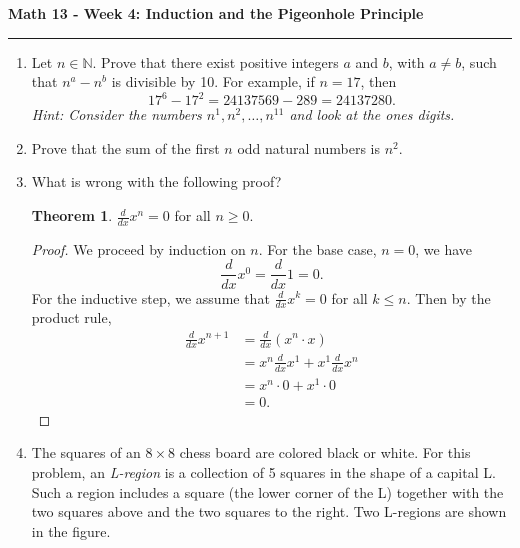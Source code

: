 \documentclass[12pt]{report}
\theoremstyle{definition}
\newtheorem{thm}{Theorem}
\newcommand{\naturals}{\mathbb{N}}
\begin{document}
\begin{center}
{\bf \Large Math 13 - Week 4: Induction and the Pigeonhole Principle}
\vspace{0.2cm}
\hrule
\end{center}

\begin{enumerate}	

\item Let $n\in \naturals$. Prove that there exist positive integers $a$ and $b$, with $a\neq b$, such that $n^a - n^b$ is divisible by 10. For example, if $n = 17$, then
\[
	17^6 - 17^2 = 24137569-289 = 24137280.
\]
\textit{Hint: Consider the numbers $n^1, n^2, \ldots, n^{11}$ and look at the ones digits.}

\vfill

\item Prove that the sum of the first $n$ odd natural numbers is $n^2$.
\vfill

\item What is wrong with the following proof?

\begin{thm}
	$\frac{d}{dx}x^n = 0$ for all $n\geq 0$.
\end{thm}

\begin{proof}
	We proceed by induction on $n$.
	For the base case, $n=0$, we have
	\begin{equation}
		\frac{d}{dx}x^0 = \frac{d}{dx}1 = 0.
	\end{equation}
	For the inductive step, we assume that $\frac{d}{dx}x^k = 0$ for all $k\leq n$. Then by the product rule,
	\begin{align}
		\frac{d}{dx}x^{n+1} &= \frac{d}{dx}(x^n\cdot x)\\
		&= x^n\frac{d}{dx}x^1 + x^1\frac{d}{dx}x^n\\
		&= x^n\cdot 0 + x^1\cdot 0\\
		&= 0.
	\end{align}
\end{proof}

\vfill\pagebreak

\item The squares of an $8\times 8$ chess board are colored black or white. For this problem, an \textit{L-region} is a collection of 5 squares in the shape of a capital L. Such a region includes a square (the lower corner of the L) together with the two squares above and the two squares to the right. Two L-regions are shown in the figure.


\end{enumerate}
\end{document}
